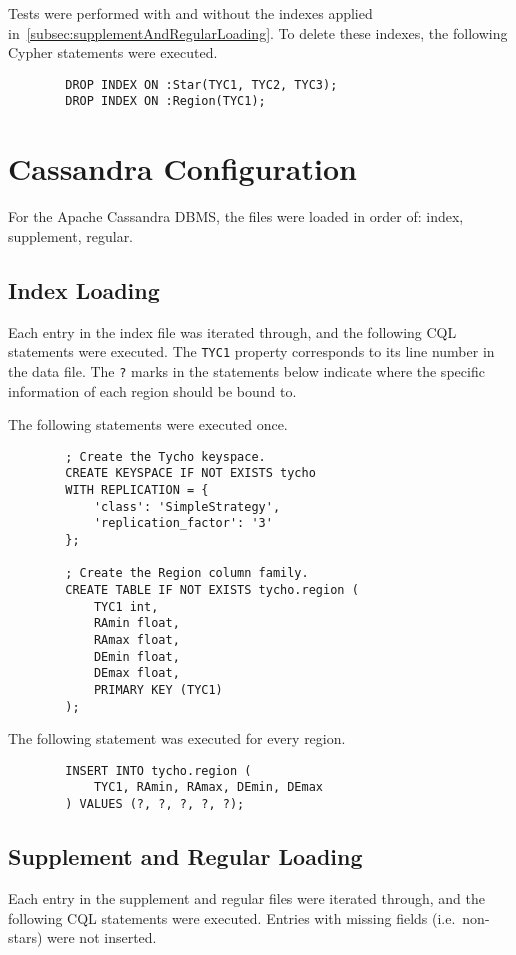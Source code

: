 \documentclass[11pt]{article}
\begin{document}
    Tests were performed with and without the indexes applied in~\autoref{subsec:supplementAndRegularLoading}.
    To delete these indexes, the following Cypher statements were executed.
    \begin{lstlisting}
        DROP INDEX ON :Star(TYC1, TYC2, TYC3);
        DROP INDEX ON :Region(TYC1);
    \end{lstlisting}

    \section{Cassandra Configuration}\label{sec:cassandraConfiguration}
    For the Apache Cassandra DBMS, the files were loaded in order of: index, supplement, regular.

    \subsection{Index Loading}\label{subsec:indexLoading2}
    Each entry in the index file was iterated through, and the following CQL statements were executed.
    The \texttt{TYC1} property corresponds to its line number in the data file.
    The \texttt{?} marks in the statements below indicate where the specific information of each region should be
    bound to.

    The following statements were executed once.
    \begin{lstlisting}
        ; Create the Tycho keyspace.
        CREATE KEYSPACE IF NOT EXISTS tycho
        WITH REPLICATION = {
            'class': 'SimpleStrategy',
            'replication_factor': '3'
        };

        ; Create the Region column family.
        CREATE TABLE IF NOT EXISTS tycho.region (
            TYC1 int,
            RAmin float,
            RAmax float,
            DEmin float,
            DEmax float,
            PRIMARY KEY (TYC1)
        );
    \end{lstlisting}

    The following statement was executed for every region.
    \begin{lstlisting}
        INSERT INTO tycho.region (
            TYC1, RAmin, RAmax, DEmin, DEmax
        ) VALUES (?, ?, ?, ?, ?);
    \end{lstlisting}

    \subsection{Supplement and Regular Loading}\label{subsec:supplementAndRegularLoading2}
    Each entry in the supplement and regular files were iterated through, and the following CQL statements
    were executed.
    Entries with missing fields (i.e.\ non-stars) were not inserted.
\end{document}
